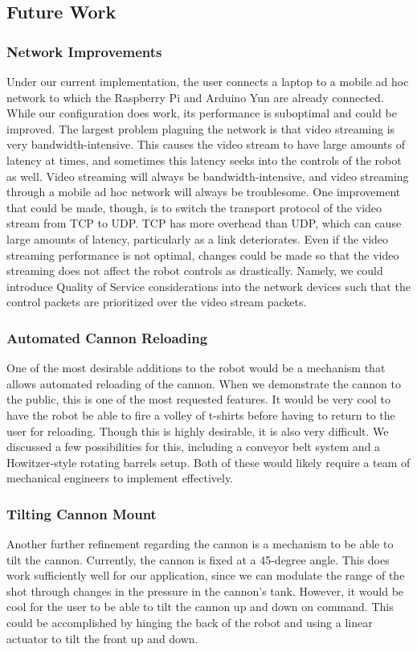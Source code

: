 \documentclass[letterpaper,12pt]{article}
\begin{document}
\subsection{Future Work}
\subsubsection{Network Improvements}
Under our current implementation, the user connects a laptop to a mobile ad hoc
network to which the Raspberry Pi and Arduino Yun are already connected. While
our configuration does work, its performance is suboptimal and could be
improved. The largest problem plaguing the network is that video streaming is
very bandwidth-intensive. This causes the video stream to have large amounts of
latency at times, and sometimes this latency seeks into the controls of the
robot as well. Video streaming will always be bandwidth-intensive, and video
streaming through a mobile ad hoc network will always be troublesome. One
improvement that could be made, though, is to switch the transport protocol of
the video stream from TCP to UDP. TCP has more overhead than UDP, which can
cause large amounts of latency, particularly as a link deteriorates. Even if the
video streaming performance is not optimal, changes could be made so that the
video streaming does not affect the robot controls as drastically. Namely, we
could introduce Quality of Service considerations into the network devices such
that the control packets are prioritized over the video stream packets.

\subsubsection{Automated Cannon Reloading}
One of the most desirable additions to the robot would be a mechanism that
allows automated reloading of the cannon. When we demonstrate the cannon to the
public, this is one of the most requested features. It would be very cool to
have the robot be able to fire a volley of t-shirts before having to return to
the user for reloading. Though this is highly desirable, it is also very
difficult. We discussed a few possibilities for this, including a conveyor belt
system and a Howitzer-style rotating barrels setup. Both of these would likely
require a team of mechanical engineers to implement effectively.

\subsubsection{Tilting Cannon Mount}
Another further refinement regarding the cannon is a mechanism to be able to
tilt the cannon. Currently, the cannon is fixed at a 45-degree angle. This does
work sufficiently well for our application, since we can modulate the range of
the shot through changes in the pressure in the cannon's tank. However, it would
be cool for the user to be able to tilt the cannon up and down on command. This
could be accomplished by hinging the back of the robot and using a linear
actuator to tilt the front up and down.
\end{document}
